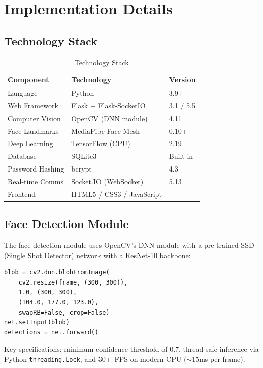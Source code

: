 \documentclass[conference,10pt]{IEEEtran}
\begin{document}
\section{Implementation Details}

\subsection{Technology Stack}

\begin{table}[H]
\centering
\caption{Technology Stack}
\label{tab:techstack}
\begin{tabular}{lll}
\toprule
\textbf{Component} & \textbf{Technology} & \textbf{Version} \\
\midrule
Language & Python & 3.9+ \\
Web Framework & Flask + Flask-SocketIO & 3.1 / 5.5 \\
Computer Vision & OpenCV (DNN module) & 4.11 \\
Face Landmarks & MediaPipe Face Mesh & 0.10+ \\
Deep Learning & TensorFlow (CPU) & 2.19 \\
Database & SQLite3 & Built-in \\
Password Hashing & bcrypt & 4.3 \\
Real-time Comms & Socket.IO (WebSocket) & 5.13 \\
Frontend & HTML5 / CSS3 / JavaScript & --- \\
\bottomrule
\end{tabular}
\end{table}

\subsection{Face Detection Module}

The face detection module uses OpenCV's DNN module with a pre-trained SSD (Single Shot Detector) network with a ResNet-10 backbone:

\begin{lstlisting}[style=pythonstyle, caption={Face Detection — OpenCV DNN}]
blob = cv2.dnn.blobFromImage(
    cv2.resize(frame, (300, 300)),
    1.0, (300, 300),
    (104.0, 177.0, 123.0),
    swapRB=False, crop=False)
net.setInput(blob)
detections = net.forward()
\end{lstlisting}

Key specifications: minimum confidence threshold of 0.7, thread-safe inference via Python \texttt{threading.Lock}, and 30+~FPS on modern CPU ($\sim$15ms per frame).
\end{document}
